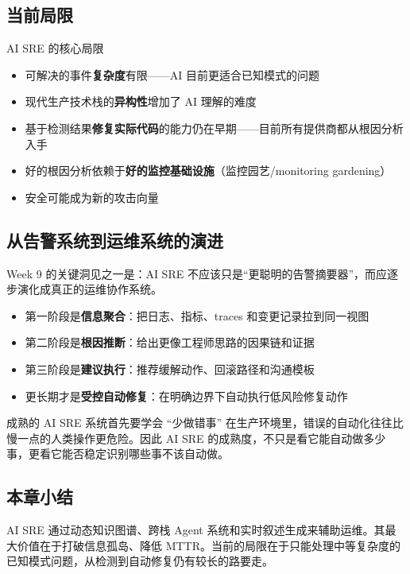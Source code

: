 \subsection{当前局限}

\begin{warningbox}{AI SRE 的核心局限}
\begin{itemize}
    \item 可解决的事件\textbf{复杂度}有限——AI 目前更适合已知模式的问题
    \item 现代生产技术栈的\textbf{异构性}增加了 AI 理解的难度
    \item 基于检测结果\textbf{修复实际代码}的能力仍在早期——目前所有提供商都从根因分析入手
    \item 好的根因分析依赖于\textbf{好的监控基础设施}（监控园艺/monitoring gardening）
    \item 安全可能成为新的攻击向量
\end{itemize}
\end{warningbox}

\subsection{从告警系统到运维系统的演进}

Week 9 的关键洞见之一是：AI SRE 不应该只是“更聪明的告警摘要器”，而应逐步演化成真正的运维协作系统。

\begin{itemize}
    \item 第一阶段是\textbf{信息聚合}：把日志、指标、traces 和变更记录拉到同一视图
    \item 第二阶段是\textbf{根因推断}：给出更像工程师思路的因果链和证据
    \item 第三阶段是\textbf{建议执行}：推荐缓解动作、回滚路径和沟通模板
    \item 更长期才是\textbf{受控自动修复}：在明确边界下自动执行低风险修复动作
\end{itemize}

\begin{knowledgebox}{成熟的 AI SRE 系统首先要学会 ``少做错事''}
在生产环境里，错误的自动化往往比慢一点的人类操作更危险。因此 AI SRE 的成熟度，不只是看它能自动做多少事，更看它能否稳定识别哪些事不该自动做。
\end{knowledgebox}

\subsection{本章小结}

AI SRE 通过动态知识图谱、跨栈 Agent 系统和实时叙述生成来辅助运维。其最大价值在于打破信息孤岛、降低 MTTR。当前的局限在于只能处理中等复杂度的已知模式问题，从检测到自动修复仍有较长的路要走。

